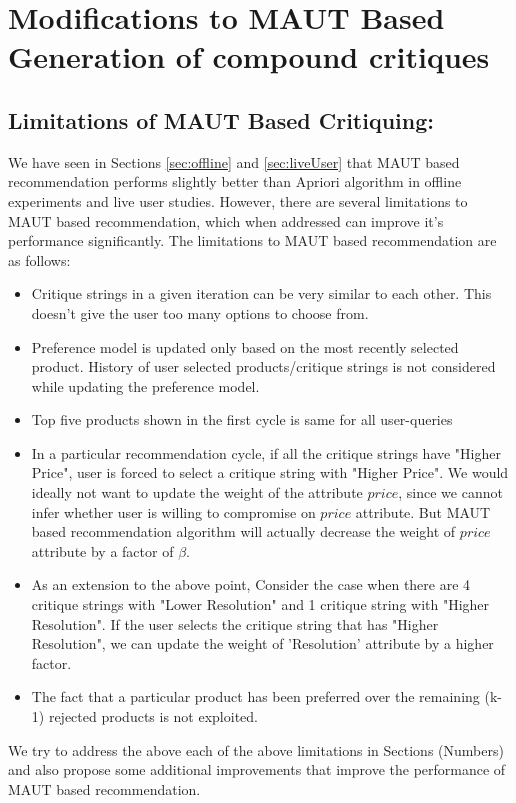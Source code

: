 \chapter{Modifications to MAUT Based Generation of compound critiques}
\label{chap:modifications}
\section{Limitations of MAUT Based Critiquing:}
\label{sec:limitations}

We have seen in Sections \ref{sec:offline} and \ref{sec:liveUser} that MAUT based recommendation performs slightly better than Apriori algorithm in offline experiments and live user studies.
However, there are several limitations to MAUT based recommendation, which when addressed can improve it's performance significantly.
The limitations to MAUT based recommendation are as follows:
\begin{itemize}
\setlength{\itemsep}{5pt}
\item Critique strings in a given iteration can be very similar to each other. This doesn't give the user too many options to choose from.
\item Preference model is updated only based on the most recently selected product. History of user selected products/critique strings is not considered while updating the preference model.
\item Top five products shown in the first cycle is same for all user-queries
\item In a particular recommendation cycle, if all the critique strings have "Higher Price", user is forced to select a critique string with "Higher Price". We would ideally not want to update the weight of the attribute $price$, since we cannot infer whether user is willing to compromise on $price$ attribute. But MAUT based recommendation algorithm will actually decrease the weight of $price$ attribute by a factor of $\beta$.
\item As an extension to the above point, Consider the case when there are 4 critique strings with "Lower Resolution" and 1 critique string with "Higher Resolution". If the user selects the critique string that has "Higher Resolution", we can update  the weight of 'Resolution' attribute by a higher factor.
\item The fact that a particular product has been preferred over the remaining (k-1) rejected products is not exploited.

\end{itemize}
We try to address the above each of the above limitations in Sections (Numbers) and also propose some additional improvements that improve the performance of MAUT based recommendation.












